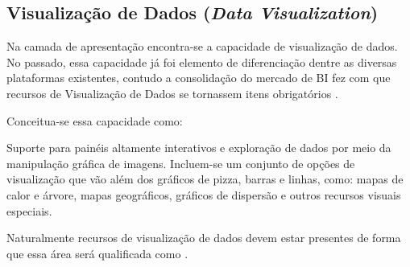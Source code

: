 \subsection{Visualização de Dados (\emph{Data Visualization})}
\label{sub-visualization}

Na camada de apresentação encontra-se a capacidade de visualização de dados. No passado, essa capacidade já foi elemento de diferenciação dentre as diversas plataformas existentes, contudo a consolidação do mercado de BI fez com que recursos de Visualização de Dados se tornassem itens obrigatórios \cite{gartner:magicquadrant}.

Conceitua-se essa capacidade como:
\begin{definition}
Suporte para painéis altamente interativos e exploração de dados por meio da manipulação gráfica de imagens. Incluem-se um conjunto de opções de visualização que vão além dos gráficos de pizza, barras e linhas, como: mapas de calor e árvore, mapas geográficos, gráficos de dispersão e outros recursos visuais especiais.
\end{definition}


Naturalmente recursos de visualização de dados devem estar presentes de forma que essa área será qualificada como \MUST.
